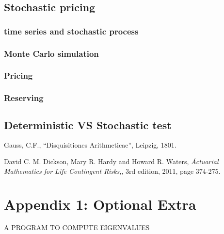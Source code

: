 \documentclass{report}
\begin{document}
\section{Stochastic pricing}
\subsection{time series and stochastic process}
\subsection{Monte Carlo simulation}
\subsection{Pricing}
\subsection{Reserving}



\section{Deterministic VS Stochastic test}






\begin{thebibliography}{99}             %

 Gauss, C.F.,
    ``Disquisitiones Arithmeticae'', Leipzig, 1801.

  David C. M. Dickson, Mary R. Hardy and Howard R. Waters,
    {\em \"Actuarial Mathematics for Life Contingent Risks,},
    3rd edition, 2011, 
    page 374-275.



\end{thebibliography}


\chapter*{Appendix 1: Optional Extra}

\begin{center}
   {\Large A PROGRAM TO COMPUTE EIGENVALUES}
\end{center}
\end{document}
